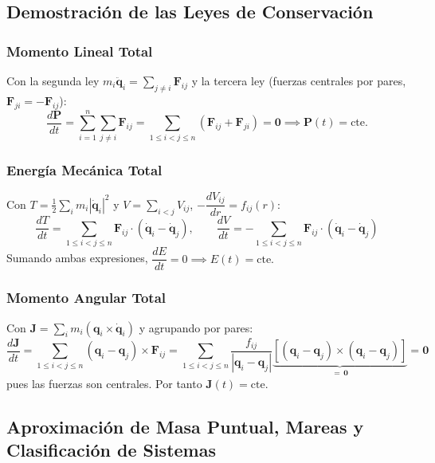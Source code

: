 \documentclass[11pt, a4paper]{article}
\begin{document}
\subsection{Demostración de las Leyes de Conservación}

\subsubsection{Momento Lineal Total}
Con la segunda ley $m_i \ddot{\mathbf{q}}_i = \sum_{j\neq i}\mathbf{F}_{ij}$ y la tercera ley (fuerzas centrales por pares, $\mathbf{F}_{ji} = -\mathbf{F}_{ij}$):
\begin{equation}
	\frac{d\mathbf{P}}{dt} = \sum_{i=1}^n \sum_{j \neq i} \mathbf{F}_{ij} = \sum_{1 \le i < j \le n} (\mathbf{F}_{ij} + \mathbf{F}_{ji}) = \mathbf{0}
	\implies \mathbf{P}(t) = \text{cte.}
\end{equation}

\subsubsection{Energía Mecánica Total}
Con $T = \tfrac{1}{2}\sum_i m_i |\dot{\mathbf{q}}_i|^2$ y $V = \sum_{i<j} V_{ij}$, $-\dfrac{dV_{ij}}{dr} = f_{ij}(r)$:
\begin{equation}
	\frac{dT}{dt} = \sum_{1 \le i < j \le n} \mathbf{F}_{ij} \cdot (\dot{\mathbf{q}}_i - \dot{\mathbf{q}}_j), \qquad
	\frac{dV}{dt} = -\sum_{1 \le i < j \le n} \mathbf{F}_{ij} \cdot (\dot{\mathbf{q}}_i - \dot{\mathbf{q}}_j)
\end{equation}
Sumando ambas expresiones, $\dfrac{dE}{dt} = 0 \implies E(t) = \text{cte.}$

\subsubsection{Momento Angular Total}
Con $\mathbf{J} = \sum_i m_i (\mathbf{q}_i \times \dot{\mathbf{q}}_i)$ y agrupando por pares:
\begin{equation}
	\frac{d\mathbf{J}}{dt} = \sum_{1 \le i < j \le n} (\mathbf{q}_i - \mathbf{q}_j) \times \mathbf{F}_{ij} = \sum_{1 \le i < j \le n} \frac{f_{ij}}{|\mathbf{q}_i - \mathbf{q}_j|} \underbrace{\left[ (\mathbf{q}_i - \mathbf{q}_j) \times (\mathbf{q}_i - \mathbf{q}_j) \right]}_{= \, \mathbf{0}} = \mathbf{0}
\end{equation}
pues las fuerzas son centrales. Por tanto $\mathbf{J}(t) = \text{cte.}$

\subsection{Aproximación de Masa Puntual, Mareas y Clasificación de Sistemas}
\end{document}
